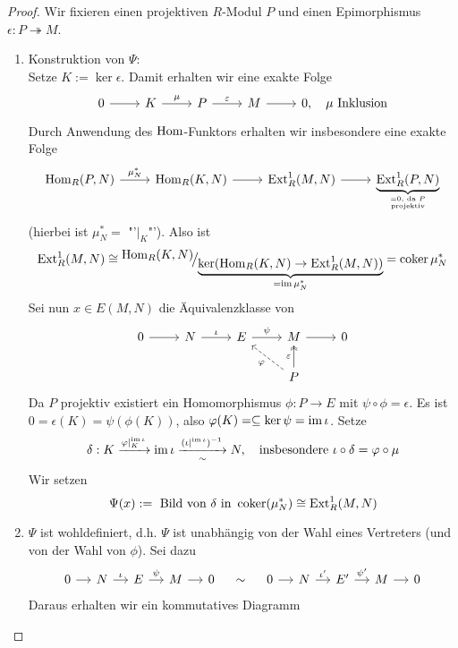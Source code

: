 \begin{proof}
	Wir fixieren einen projektiven $R$-Modul $P$ und einen Epimorphismus $\epsilon:P \twoheadrightarrow M$.
	\begin{enumerate}
		\item Konstruktion von $\Psi$: \\
		Setze $K:= \ker \epsilon$. Damit erhalten wir eine exakte Folge 
		$$\begin{tikzcd}
		0 \arrow{r} & K \arrow{r}{\mu} & P \arrow{r}{\epsilon} & M \arrow{r} & 0, \quad \mu \text{ Inklusion}
		\end{tikzcd}$$
		Durch Anwendung des $\operatorname{Hom}$-Funktors erhalten wir insbesondere eine exakte Folge
		$$\begin{tikzcd}
		\Hom_R(P,N) \arrow{r}{\mu_N^*} & \Hom_R(K,N) \arrow{r} & \Ext_R^1(M,N) \arrow{r} & \underbrace{\Ext_R^1(P,N)}_{=0, \text{ da }  P \atop \text{projektiv}}
		\end{tikzcd}$$
		(hierbei ist $\mu_N^* =$ "'$\big|_K$"'). Also ist 
		$$\Ext_R^1(M,N) \cong \QR{\Hom_R(K,N)}{\underbrace{\ker(\Hom_R(K,N) \to \Ext_R^1(M,N))}_{=\im \mu_N^*}} = \coker \mu_N^*$$
		Sei nun $x\in E(M,N)$ die Äquivalenzklasse von 
		$$\begin{tikzcd}
		0 \arrow{r} & N \arrow{r}{\iota} & E \arrow{r}{\psi} & M \arrow{r} & 0 \\
		& & & P \arrow[dashed]{ul}{\phi} \arrow[two heads]{u}{\epsilon} & 
		\end{tikzcd}$$
		Da $P$ projektiv existiert ein Homomorphismus $\phi : P \to E$ mit $\psi \circ \phi = \epsilon$. Es ist $0= \epsilon(K) = \psi(\phi(K))$, also $\varphi(K) = \subseteq \ker \psi = \operatorname{im} \iota$. Setze 
		$$\delta:K \xrightarrow{\varphi|_K^{\operatorname{im} \iota}} \operatorname{im} \iota \underset{\sim}{\xrightarrow{(\iota|^{\operatorname{im} \iota})^{-1} }} N, \quad \text{insbesondere } \iota \circ \delta = \varphi \circ \mu$$
		Wir setzen 
		$$\Psi(x) := \text{ Bild von } \delta \text{ in }\operatorname{coker}(\mu_N^*) \cong \text{Ext}_R^1(M,N)$$
		\item $\Psi$ ist wohldefiniert, d.h. $\Psi$ ist unabhängig von der Wahl eines Vertreters (und von der Wahl von $\phi$). Sei dazu 
				$$\begin{tikzcd}[column sep = small]
			0\arrow{r} & N \arrow{r}{\iota} & E\arrow{r}{\psi} & M \arrow{r} & 0
			\end{tikzcd}\quad  \sim \quad \begin{tikzcd}[column sep = small]
			0\arrow{r} & N \arrow{r}{\iota'} & E'\arrow{r}{\psi'} & M \arrow{r} & 0
			\end{tikzcd}$$
			Daraus erhalten wir ein kommutatives Diagramm

\end{enumerate}
\end{proof}
